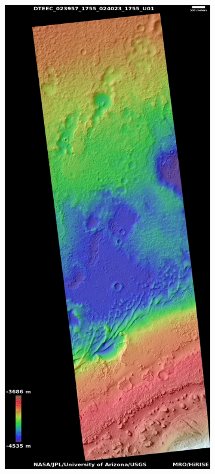 \documentclass[12pt]{article}
\begin{document}
\begin{figure}[h!]
  \centering
  \begin{subfigure}[t]{0.35\textwidth}
    \centering
    \includegraphics[height=0.4\paperheight]{figures/maps/ESP_023957_1755/DTEEC_023957_1755_024023_1755_U01.jpg}

\end{subfigure}
\end{figure}
\end{document}
